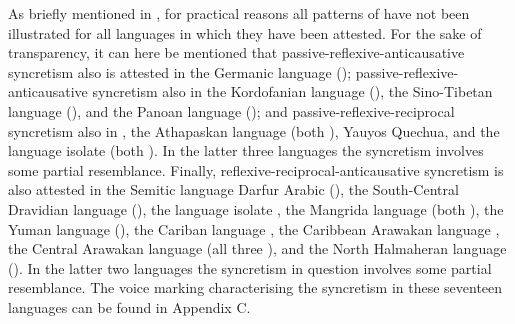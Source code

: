 As briefly mentioned in , for practical reasons all patterns of  have not been illustrated for all languages in which they have been attested. For the sake of transparency, it can here be mentioned that passive-reflexive-anticausative syncretism also is attested in the Germanic language  (); passive-reflexive-anticausative syncretism also in the Kordofanian language  (), the Sino-Tibetan language  (), and the Panoan language  (); and passive-reflexive-reciprocal syncretism also in , the Athapaskan language  (both ), Yauyos Quechua, and the language isolate  (both ). In the latter three languages the syncretism involves some partial resemblance. Finally, reflexive-reciprocal-anticausative syncretism is also attested in the Semitic language Darfur Arabic (), the South-Central Dravidian language  (), the language isolate , the Mangrida language  (both ), the Yuman language  (), the Cariban language , the Caribbean Arawakan language , the Central Arawakan language  (all three ), and the North Halmaheran language  (). In the latter two languages the syncretism in question involves some partial resemblance. The voice marking characterising the syncretism in these seventeen languages can be found in Appendix C. 

